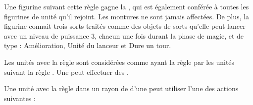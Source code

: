 Une figurine suivant cette règle gagne la \hatred{}, qui est également conférée à toutes les figurines de unité qu'il rejoint. Les montures ne sont jamais affectées. De plus, la figurine connait trois sorts traités comme des objets de sorts qu'elle peut lancer avec un niveau de puissance 3, chacun une fois durant la phase de magie, et de type : Amélioration, Unité du lanceur et Dure un tour.

\armyspecialruleentry{\parentunitsandsupportunits}

Les unités avec la règle \supportunit{} sont considérées comme ayant la règle \insignificant{} par les unités suivant la règle \parentunit{}. Une \supportunit{} peut effectuer des \supportingactions{}. 

\armyspecialruleentry{\supportingactions}

Une unité avec la règle \supportunit{} dans un rayon de  d'une \parentunit{} peut utiliser l'une des actions suivantes :

